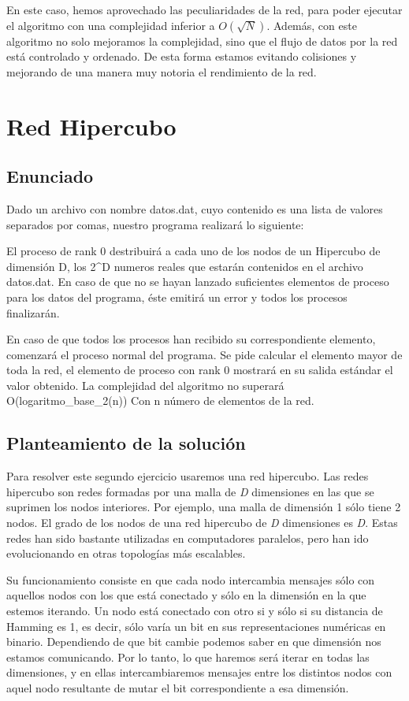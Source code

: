 \documentclass[11pt]{article}
\begin{document}
En este caso, hemos aprovechado las peculiaridades de la red, para poder ejecutar el algoritmo con una complejidad inferior a $O(\sqrt{N})$. Además, con este algoritmo no solo mejoramos la complejidad, sino que el flujo de datos por la red está controlado y ordenado. De esta forma estamos evitando colisiones y mejorando de una manera muy notoria el rendimiento de la red.
	
	
	
\section{Red Hipercubo}
\subsection{Enunciado}
Dado un archivo con nombre datos.dat, cuyo contenido es una lista de valores separados por comas, nuestro programa realizará lo siguiente:

El proceso de rank 0 destribuirá a cada uno de los nodos de un Hipercubo de dimensión D, los 2\^{}D numeros reales que estarán contenidos en el archivo datos.dat. En caso de que no se hayan lanzado suficientes elementos de proceso para los datos del programa, éste emitirá un error y todos los procesos finalizarán.

En caso de que todos los procesos han recibido su correspondiente elemento, comenzará el proceso normal del programa. Se pide calcular el elemento mayor de toda la red, el elemento de proceso con rank 0 mostrará en su salida estándar el valor obtenido. La complejidad del algoritmo no superará O(logaritmo\_base\_2(n)) Con n número de elementos de la red.


\subsection{Planteamiento de la solución}
Para resolver este segundo ejercicio usaremos una red hipercubo. Las redes hipercubo son redes formadas por una malla de \emph{D} dimensiones en las que se suprimen los nodos interiores. Por ejemplo, una malla de dimensión 1 sólo tiene 2 nodos. El grado de los nodos de una red hipercubo de \emph{D} dimensiones es \emph{D}. Estas redes han sido bastante utilizadas en computadores paralelos, pero han ido evolucionando en otras topologías más escalables.

Su funcionamiento consiste en que cada nodo intercambia mensajes sólo con aquellos nodos con los que está conectado y sólo en la dimensión en la que estemos iterando. Un nodo está conectado con otro si y sólo si su distancia de Hamming es 1, es decir, sólo varía un bit en sus representaciones numéricas en binario. Dependiendo de que bit cambie podemos saber en que dimensión nos estamos comunicando. Por lo tanto, lo que haremos será iterar en todas las dimensiones, y en ellas intercambiaremos mensajes entre los distintos nodos con aquel nodo resultante de mutar el bit correspondiente a esa dimensión.
\end{document}
